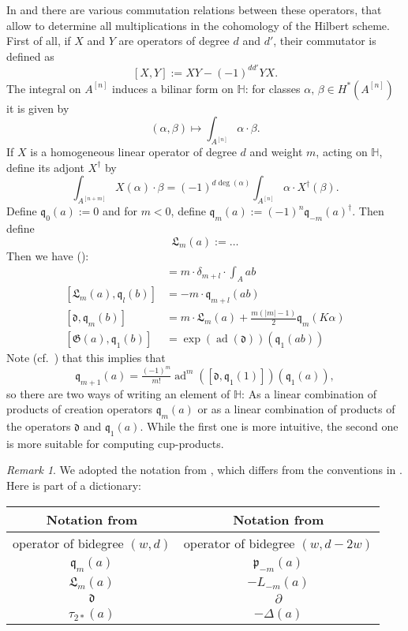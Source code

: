 \documentclass{amsart}
\DeclareMathOperator{\ad}{ad}
\newcommand{\hilb}[1]{^{[#1]}}
\newcommand{\p}{\mathfrak{p}}
\newcommand{\G}{\mathfrak{G}}
\newcommand{\q}{\mathfrak{q}}
\renewcommand{\H}{\mathbb{H}}
\theoremstyle{plain}
\theoremstyle{definition}
\theoremstyle{remark}
\newtheorem{remark}[theorem]{Remark}
\begin{document}
In \cite{LehnSorger} and \cite{LiQinWang} there are various commutation relations between these operators, that allow to determine all multiplications in the cohomology of the Hilbert scheme. First of all, if $X$ and $Y$ are operators of degree $d$ and $d'$, their commutator is defined as 
$$
[X,Y] := XY - (-1)^{dd'}YX.
$$
The integral on $A\hilb{n}$ induces a bilinar form on $\H$: for classes $\alpha,\,\beta\in H^*(A\hilb{n})$ it is given by
$$
(\alpha,\beta) \longmapsto \int_{A\hilb{n}}\alpha\cdot\beta.
$$
If $X$ is a homogeneous linear operator of degree $d$ and weight $m$, acting on $\H$, define its adjont $X^\dagger$ by
$$
\int_{A\hilb{n+m}}X(\alpha)\cdot\beta = (-1)^{d\deg(\alpha)}\int_{A\hilb{n}} \alpha \cdot X^\dagger (\beta).
$$
Define $\q_0(a) :=0$ and for $m<0$, define $\q_m(a) := (-1)^n \q_{-m}(a)^\dagger$. Then define
$$
\mathfrak{L}_m(a) := \ldots
$$
Then we have (\cite[Thm.~2.16]{LiQinWang}):
\begin{align}
[\q_m(a), \q_l(b)] &= m\cdot \delta_{m+l} \cdot \int_A ab \\
[\mathfrak{L}_m(a),\q_l(b)] &= -m\cdot \q_{m+l}(ab) \\
[\mathfrak{d},\q_m(b)] &= m \cdot \mathfrak{L}_m(a) + \tfrac{m(|m|-1)}{2} \q_m(K\alpha) \\
[\G(a),\q_1(b)] &= \exp(\ad(\mathfrak{d}))(\q_1(a b) )
\end{align}
Note (cf.~\cite[Thm.~3.8]{LehnSorger}) that this implies that 
$$
\q_{m+1}(a) = \tfrac{(-1)^m}{m!}\ad^m([\mathfrak{d},\q_1(1)])(\q_1(a)),
$$
so there are two ways of writing an element of $\H$: As a linear combination of products of creation operators $\q_m(a)$ or as a linear combination of products of the operators $\mathfrak{d}$ and $\q_1(a)$. While the first one is more intuitive, the second one is more suitable for computing cup-products.

\begin{remark}
We adopted the notation from \cite{LiQinWang}, which differs from the conventions in \cite{LehnSorger}. Here is part of a dictionary:

\begin{tabular}{c|c} 
Notation from \cite{LiQinWang} & Notation from \cite{LehnSorger} \\\hline
operator of bidegree $(w,d)$ & operator of bidegree $(w,d-2w)$\\
$\q_m(a) $ & $\p_{-m}(a)$ \\
$ \mathfrak{L}_m(a) $ & $ - L_{-m}(a)$ \\
$ \mathfrak{d} $ & $ \partial $ \\
$\tau_{2*}(a)$& $-\Delta(a)$
\end{tabular}


\end{remark}
\end{document}
